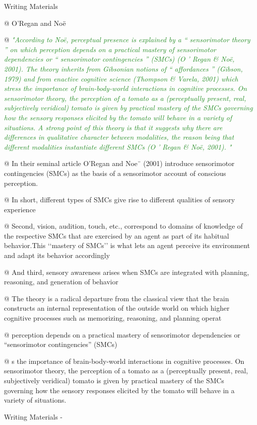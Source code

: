 \documentclass[utf8]{article}
\newenvironment{WritingMaterials} %
    	{
            \begin{tcolorbox}[enhanced,
                title=-,
                size=small,
                colbacktitle=Aquamarine,
                drop fuzzy shadow,
                fontupper=\small,
                boxrule=0.4pt,
                colback=Aquamarine!10!white,
                sharp corners]
                Writing Materials
            \end{tcolorbox}
            \begin{easylist}[itemize]
    	}
    	{
            \end{easylist}  
            \begin{tcolorbox}[enhanced,
                halign=flush right,
                halign title=right,
                size=small,
                colbacktitle=Aquamarine,
                drop fuzzy shadow,
                fontupper=\small,
                boxrule=0.4pt,
                colback=Aquamarine,
                colupper=White,
                sharp corners]
                Writing Materials -
            \end{tcolorbox}        
    	}
\newcommand{\rewrite}[1]{\textcolor{ForestGreen}{\textit{"#1"}}\newline}
\begin{document}
			\begin{WritingMaterials} %

				@ O’Regan and Noë


				@ \rewrite{According to Noë, perceptual presence is explained by a “ sensorimotor theory ” on which perception depends on a practical mastery of sensorimotor dependencies or “ sensorimotor contingencies ” (SMCs) (O ’ Regan \& Noë, 2001). The theory inherits from Gibsonian notions of “ affordances ” (Gibson, 1979) and from enactive cognitive science (Thompson \& Varela, 2001) which stress the importance of brain-body-world interactions in cognitive processes. On sensorimotor theory, the perception of a tomato as a (perceptually present, real, subjectively veridical) tomato is given by practical mastery of the SMCs governing how the sensory responses elicited by the tomato will behave in a variety of situations. A strong point of this theory is that it suggests why there are differences in qualitative character between modalities, the reason being that different modalities instantiate different SMCs (O ’ Regan \& Noë, 2001). }

				@ In their seminal article O’Regan and Noe¨ (2001) introduce sensorimotor contingencies (SMCs) as the basis of a sensorimotor account of conscious perception.

				@ In short, different types of SMCs give rise to different qualities of sensory experience

				@  Second, vision, audition, touch, etc., correspond to domains of knowledge of the respective SMCs that are exercised by an agent as part of its habitual behavior.This ‘‘mastery of SMCs’’ is what lets an agent perceive its environment and adapt its behavior accordingly

				@ And third, sensory awareness arises when SMCs are integrated with planning, reasoning, and generation of behavior

				@ The theory is a radical departure from the classical view that the brain constructs an internal representation of the outside world on which higher cognitive processes such as memorizing, reasoning, and planning operat

				@ perception depends on a practical mastery of sensorimotor dependencies or “sensorimotor contingencies” (SMCs)

				@ s the importance of brain-body-world interactions in cognitive processes. On sensorimotor theory, the perception of a tomato as a (perceptually present, real, subjectively veridical) tomato is given by practical mastery of the SMCs governing how the sensory responses elicited by the tomato will behave in a variety of situations.


\end{WritingMaterials}
\end{document}
